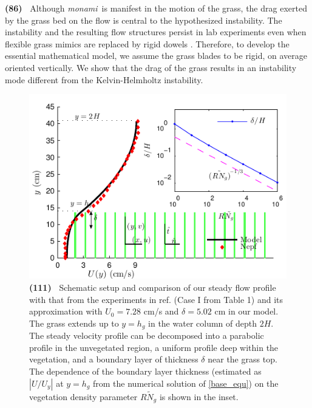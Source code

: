 \documentclass[aps,prl,reprint,twocolumn,superscriptaddress,sort&compress,10pt]{revtex4-1}  %
\newcommand{\hg}{h_g}
\newcommand{\Rey}{{R}}
\newcommand{\Ndg}{\tilde{N}_g}
\newcommand{\monami}{\textit{monami}}
\newcommand{\words}[1]{\textbf{(#1)~}}
\newcommand{\ReyNdg}{{\Rey\Ndg}}
\begin{document}
\words{86} Although \monami ~is manifest in the motion of the grass, the drag exerted by the grass bed on the flow is central to the hypothesized instability. 
The instability and the resulting flow structures persist in lab experiments even when flexible grass mimics are replaced by rigid dowels \cite{Ghisal02,Nepf06}. 
Therefore, to develop the essential mathematical model, we assume the grass blades to be rigid, on average oriented vertically.
We show that the drag of the grass results in an instability mode different from the Kelvin-Helmholtz instability.
\begin{figure}
\includegraphics[scale=1]{Grass_Base_Nepf_shear}
\caption{
\words{111} Schematic setup and comparison of our steady flow profile with that from the experiments in ref. \cite{Nepf04} (Case I from Table 1) %
 and its approximation with $U_0=7.28$ cm/s and $\delta = 5.02$ cm in our model. The grass extends up to $y=\hg$ in the water column of depth $2H$. 
The steady velocity profile can be decomposed into a parabolic profile in the unvegetated region, a uniform profile deep within the vegetation, and a boundary layer of thickness $\delta$ near the grass top. 
The dependence of the boundary layer thickness (estimated as $|U/U_y|$ at $y=\hg$ from the numerical solution of \eqref{base_equ}) on the vegetation density parameter $\ReyNdg$ is shown in the inset.
}
\label{basicflow}
\end{figure}
\end{document}
